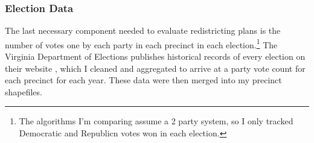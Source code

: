 \subsubsection{Election Data}

The last necessary component needed to evaluate redistricting plans is the number of votes one by each party in each precinct in each election.\footnote{The algorithms I'm comparing assume a 2 party system, so I only tracked Democratic and Republicn votes won in each election.} The Virginia Department of Elections publishes historical records of every election on their website \parencite{virginiadepartmentofelections}, which I cleaned and aggregated to arrive at a party vote count for each precinct for each year. These data were then merged into my precinct shapefiles.